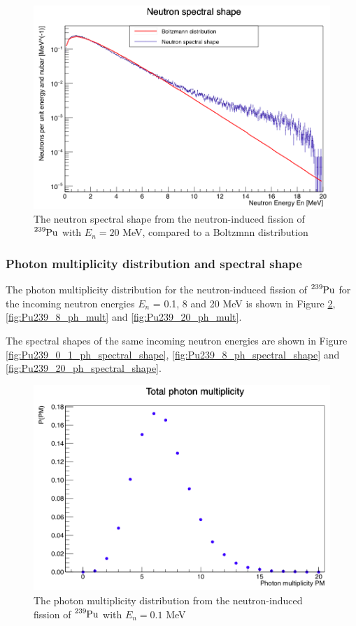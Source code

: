 \documentclass[]{article}
\begin{document}
\begin{figure} [H]
	\centering
	\includegraphics[scale=0.36]{Pu239_20_n_spectral_shape.png}
	\caption{The neutron spectral shape from the neutron-induced fission of $\ce{^{239}Pu}$ with $E_n = 20$ MeV, compared to a Boltzmnn distribution}
	\label{fig:Pu239_20_n_spectral_shape}
\end{figure}

\subsubsection{Photon multiplicity distribution and spectral shape}

The photon multiplicity distribution for the neutron-induced fission of $\ce{^{239}Pu}$ for the incoming neutron energies $E_n$ = 0.1, 8 and 20 MeV is shown in Figure \ref{fig:Pu239_0_1_ph_mult}, \ref{fig:Pu239_8_ph_mult} and \ref{fig:Pu239_20_ph_mult}.

The spectral shapes of the same incoming neutron energies are shown in Figure \ref{fig:Pu239_0_1_ph_spectral_shape}, \ref{fig:Pu239_8_ph_spectral_shape} and \ref{fig:Pu239_20_ph_spectral_shape}.

\begin{figure} [H]
	\centering
	\includegraphics[scale=0.36]{Pu239_0_1_ph_mult.png}
	\caption{The photon multiplicity distribution from the neutron-induced fission of $\ce{^{239}Pu}$ with $E_n = 0.1$ MeV}
	\label{fig:Pu239_0_1_ph_mult}
\end{figure}
\end{document}
